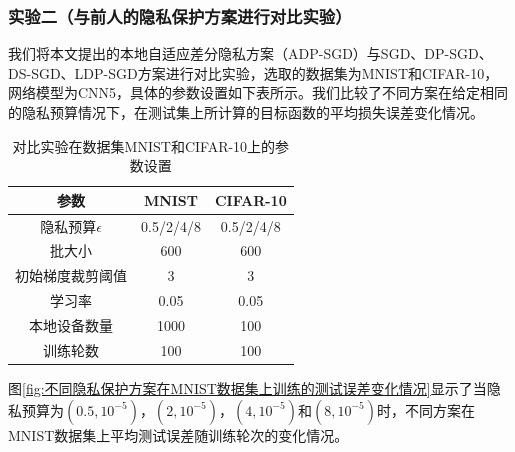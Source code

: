\subsubsection{实验二（与前人的隐私保护方案进行对比实验）} 
我们将本文提出的本地自适应差分隐私方案（ADP-SGD）与SGD、DP-SGD、DS-SGD、LDP-SGD方案进行对比实验，选取的数据集为MNIST和CIFAR-10，网络模型为CNN5，具体的参数设置如下表所示。我们比较了不同方案在给定相同的隐私预算情况下，在测试集上所计算的目标函数的平均损失误差变化情况。

\begin{table}[H]
	\centering
	\begin{tabular}{ccc}
		\hline
		参数& MNIST& CIFAR-10\\
		\hline
		隐私预算$\epsilon$& 0.5/2/4/8& 0.5/2/4/8\\
		批大小& 600& 600\\
		初始梯度裁剪阈值& 3& 3\\
		学习率& 0.05& 0.05\\
		本地设备数量& 1000& 100\\
		训练轮数& 100& 100\\
		\hline
	\end{tabular}
	\caption{对比实验在数据集MNIST和CIFAR-10上的参数设置}
	\label{tab1}
\end{table}

图\ref{fig:不同隐私保护方案在MNIST数据集上训练的测试误差变化情况}显示了当隐私预算为$\left(0.5,10^{-5}\right)$，$\left(2,10^{-5}\right)$，$\left(4,10^{-5}\right)$和$\left(8,10^{-5}\right)$时，不同方案在MNIST数据集上平均测试误差随训练轮次的变化情况。

